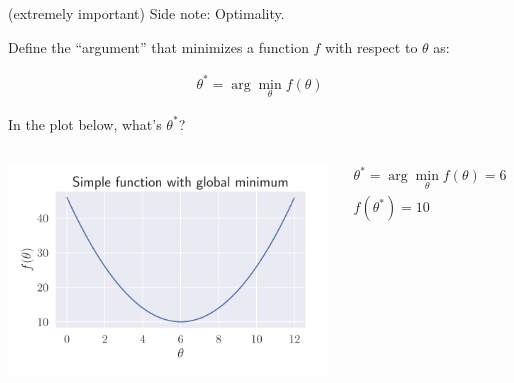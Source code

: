 \documentclass[aspectratio=169, handout]{beamer}
\begin{document}
\begin{frame}{(extremely important) Side note: Optimality.}


Define the ``argument'' that minimizes a function $f$ with respect to $\theta$ as:

\begin{align*}
\theta^* = \arg \min_{\theta} f(\theta)
\end{align*}

In the plot below, what's $\theta^*$?

\vspace{-8mm}

\begin{columns}
\begin{center}
\includegraphics[scale=0.5]{figures/simple_min}
\end{center}

\pause
\begin{align*}
\theta^* = \arg \min_{\theta} f(\theta) = 6\\
f(\theta^*) =10
\end{align*}

\end{columns}

\end{frame}
\end{document}
